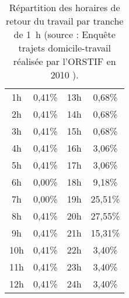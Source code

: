 \begin{table}[h]
\centering
\begin{tabular}{|c|c||c|c|}
\hline
1h & 0,41\% & 13h & 0,68\%\\
2h & 0,41\% & 14h & 0,68\%\\
3h & 0,41\% & 15h & 0,68\%\\
4h & 0,41\% & 16h & 3,06\%\\
5h & 0,41\% & 17h & 3,06\%\\
6h & 0,00\% & 18h & 9,18\%\\
7h & 0,00\% & 19h & 25,51\%\\
8h & 0,41\% & 20h & 27,55\%\\
9h & 0,41\% & 21h & 15,31\%\\
10h & 0,41\% & 22h & 3,40\%\\
11h & 0,41\% & 23h & 3,40\%\\
12h & 0,41\% & 24h & 3,40\%\\
\hline
\end{tabular}
\caption{Répartition des horaires de retour du travail par tranche de \SI{1}{\hour} (source : Enquête trajets domicile-travail réalisée par l'ORSTIF en 2010 \cite{ORSTIF}).\label{horaires}}
\text{}
\end{table}
